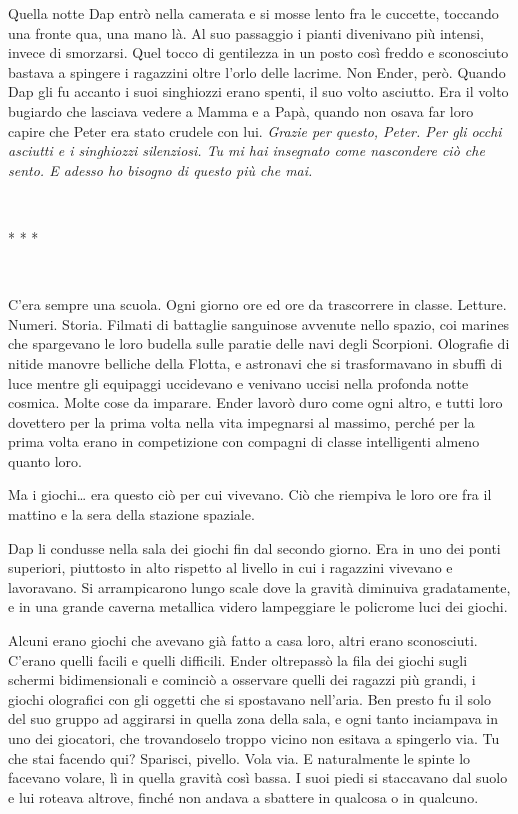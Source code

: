 {Quella notte Dap entrò nella camerata e si mosse lento fra le cuccette,
	toccando una fronte qua, una mano là. Al suo passaggio i pianti
	divenivano più intensi, invece di smorzarsi. Quel tocco di gentilezza in
	un posto così freddo e sconosciuto bastava a spingere i ragazzini oltre
	l'orlo delle lacrime. Non Ender, però. Quando Dap gli fu accanto i suoi
	singhiozzi erano spenti, il suo volto asciutto. Era il volto bugiardo
	che lasciava vedere a Mamma e a Papà, quando non osava far loro capire
	che Peter era stato crudele con lui. \emph{Grazie per questo, Peter. Per
		gli occhi asciutti e i singhiozzi silenziosi. Tu mi hai insegnato come
		nascondere ciò che sento. E adesso ho bisogno di questo più che mai.}}

{~}

\begin{center}
	{* * *}
\end{center}

{~}

{C'era sempre una scuola. Ogni giorno ore ed ore da trascorrere in
	classe. Letture. Numeri. Storia. Filmati di battaglie sanguinose
	avvenute nello spazio, coi marines che spargevano le loro budella sulle
	paratie delle navi degli Scorpioni. Olografie di nitide manovre belliche
	della Flotta, e astronavi che si trasformavano in sbuffi di luce mentre
	gli equipaggi uccidevano e venivano uccisi nella profonda notte cosmica.
	Molte cose da imparare. Ender lavorò duro come ogni altro, e tutti loro
	dovettero per la prima volta nella vita impegnarsi al massimo, perché
	per la prima volta erano in competizione con compagni di classe
	intelligenti almeno quanto loro.}

{Ma i giochi\ldots{} era questo ciò per cui vivevano. Ciò che riempiva
	le loro ore fra il mattino e la sera della stazione spaziale.}

{Dap li condusse nella sala dei giochi fin dal secondo giorno. Era in
	uno dei ponti superiori, piuttosto in alto rispetto al livello in cui i
	ragazzini vivevano e lavoravano. Si arrampicarono lungo scale dove la
	gravità diminuiva gradatamente, e in una grande caverna metallica videro
	lampeggiare le policrome luci dei giochi.}

{Alcuni erano giochi che avevano già fatto a casa loro, altri erano
	sconosciuti. C'erano quelli facili e quelli difficili. Ender oltrepassò
	la fila dei giochi sugli schermi bidimensionali e cominciò a osservare
	quelli dei ragazzi più grandi, i giochi olografici con gli oggetti che
	si spostavano nell'aria. Ben presto fu il solo del suo gruppo ad
	aggirarsi in quella zona della sala, e ogni tanto inciampava in uno dei
	giocatori, che trovandoselo troppo vicino non esitava a spingerlo via.
	Tu che stai facendo qui? Sparisci, pivello. Vola via. E naturalmente le
	spinte lo facevano volare, lì in quella gravità così bassa. I suoi piedi
	si staccavano dal suolo e lui roteava altrove, finché non andava a
	sbattere in qualcosa o in qualcuno.}

